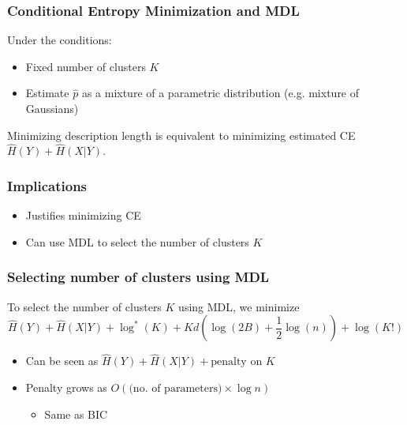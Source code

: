 \documentclass{beamer}
\begin{document}
\begin{frame}
\frametitle{Conditional Entropy Minimization and MDL}
\begin{theorem}
Under the conditions:
\begin{itemize}
\item Fixed number of clusters $K$
\item Estimate $\hat{p}$ as a mixture of a parametric distribution (e.g. mixture of Gaussians)
\end{itemize}
Minimizing description length is equivalent to minimizing estimated CE $\hat{H}(Y) + \hat{H}(X|Y)$.
\end{theorem}
\end{frame}

\begin{frame}
\frametitle{Implications}
\begin{itemize}
\item Justifies minimizing CE
\item Can use MDL to select the number of clusters $K$
\end{itemize}
\end{frame}

\begin{frame}
\frametitle{Selecting number of clusters using MDL}
\begin{theorem}
To select the number of clusters $K$ using MDL, we minimize
\[
\hat{H}(Y) + \hat{H}(X|Y) + \log^*(K) + Kd(\log(2B) + \frac{1}{2} \log(n)) + \log(K!)
\]
\end{theorem}
\begin{itemize}
\item Can be seen as $\hat{H}(Y) + \hat{H}(X|Y) + \text{penalty on }K$
\item Penalty grows as $O(\text{(no. of parameters)}\times \log n)$
\begin{itemize}
\item Same as BIC
\end{itemize}
\end{itemize}
\end{frame}

\end{document}
